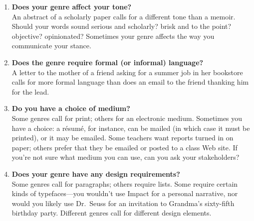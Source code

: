 \documentclass[10pt]{amsart}	%
\begin{document}
\begin{enumerate}
\begin{enumerate}
\item \textbf{Does your genre affect your tone?}\\ An abstract of a scholarly paper calls for a different tone than a memoir. Should your words sound serious and scholarly? brisk and to the point? objective? opinionated? Sometimes your genre affects the way you communicate your stance.
\item \textbf{Does the genre require formal (or informal) language?}\\ A letter to the mother of a friend asking for a summer job in her bookstore calls for more formal language than does an email to the friend thanking him for the lead.
\item \textbf{Do you have a choice of medium?}\\ Some genres call for print; others for an electronic medium. Sometimes you have a choice: a résumé, for instance, can be mailed (in which case it must be printed), or it may be emailed. Some teachers want reports turned in on paper; others prefer that they be emailed or posted to a class Web site. If you’re not sure what medium you can use, can you ask your stakeholders?
\item \textbf{Does your genre have any design requirements?}\\ Some genres call for paragraphs; others require lists. Some require certain kinds of typefaces—you wouldn’t use Impact for a personal narrative, nor would you likely use Dr.\ Seuss for an invitation to Grandma’s sixty-fifth birthday party. Different genres call for different design elements.
		\end{enumerate}
	\end{enumerate} %

\end{document}
